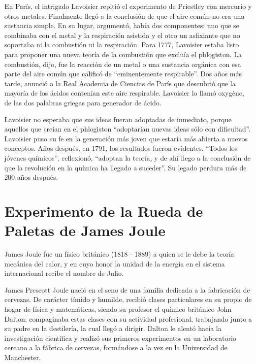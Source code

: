 \documentclass[letterpaper, 10pt, journal]{IEEEtran}
\begin{document}
En París, el intrigado Lavoisier repitió el experimento de Priestley con mercurio y otros metales. Finalmente llegó a la conclusión de que el aire común no era una sustancia simple. En su lugar, argumentó, había dos componentes: uno que se combinaba con el metal y la respiración asistida y el otro un asfixiante que no soportaba ni la combustión ni la respiración. Para 1777, Lavoisier estaba listo para proponer una nueva teoría de la combustión que excluía el phlogiston. La combustión, dijo, fue la reacción de un metal o una sustancia orgánica con esa parte del aire común que calificó de \textquotedblleft{}eminentemente respirable\textquotedblright{}. Dos años más tarde, anunció a la Real Academia de Ciencias de París que descubrió que la mayoría de los ácidos contenían este aire respirable. Lavoisier lo llamó oxygène, de las dos palabras griegas para generador de ácido.

Lavoisier no esperaba que sus ideas fueran adoptadas de inmediato, porque aquellos que creían en el phlogiston \textquotedblleft{}adoptarían nuevas ideas sólo con dificultad\textquotedblright{}. Lavoisier puso su fe en la generación más joven que estaría más abierta a nuevos conceptos. Años después, en 1791, los resultados fueron evidentes. \textquotedblleft{}Todos los jóvenes químicos\textquotedblright{}, reflexionó, \textquotedblleft{}adoptan la teoría, y de ahí llego a la conclusión de que la revolución en la química ha llegado a suceder\textquotedblright{}. Su legado perdura más de 200 años después.

\section{Experimento de la Rueda de Paletas de James Joule}
James Joule fue un físico británico (1818 - 1889)  a quien se le debe la teoría mecánica del calor, y en cuyo honor la unidad de la energía en el sistema internacional recibe el nombre de Julio.

James Prescott Joule nació en el seno de una familia dedicada a la fabricación de cervezas. De carácter tímido y humilde, recibió clases particulares en su propio de hogar de física y matemáticas, siendo su profesor el químico británico John Dalton; compaginaba estas clases con su actividad profesional, trabajando junto a su padre en la destilería, la cual llegó a dirigir. Dalton le alentó hacia la investigación científica y realizó sus primeros experimentos en un laboratorio cercano a la fábrica de cervezas, formándose a la vez en la Universidad de Manchester.
\end{document}
